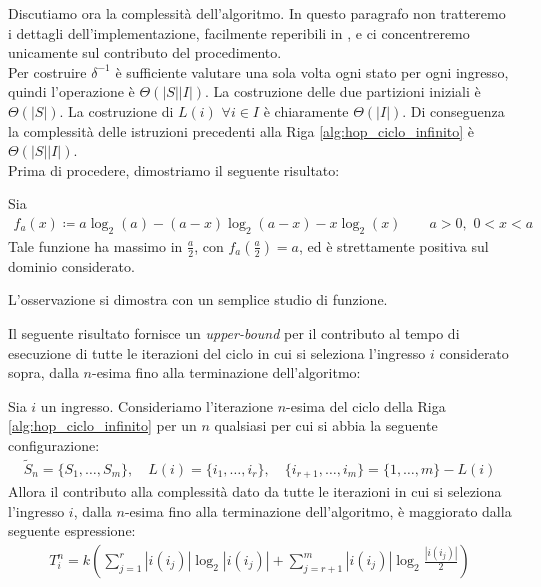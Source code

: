 Discutiamo ora la complessità dell'algoritmo. In questo paragrafo non tratteremo i dettagli dell'implementazione, facilmente reperibili in \cite{hopcroft}, e ci concentreremo unicamente sul contributo del procedimento.\\
Per costruire $\delta^{-1}$ è sufficiente valutare una sola volta ogni stato per ogni ingresso, quindi l'operazione è $\Theta(|S||I|)$. La costruzione delle due partizioni iniziali è $\Theta(|S|)$. La costruzione di $L(i) \,\,\forall i \in I$ è chiaramente $\Theta(|I|)$. Di conseguenza la complessità delle istruzioni precedenti alla Riga \ref{alg:hop_ciclo_infinito} è $\Theta(|S||I|)$.\\
Prima di procedere, dimostriamo il seguente risultato:
\begin{proposition}
    \label{obs:log}
    Sia
    \begin{gather*}
        f_a(x) \coloneqq a\log_2(a) - (a-x)\log_2(a-x) - x\log_2(x) \qquad a > 0,\,\, 0 < x < a
    \end{gather*}
    Tale funzione ha massimo in $\frac{a}{2}$, con $f_a(\frac{a}{2}) = a$, ed è strettamente positiva sul dominio considerato.
\end{proposition}
\begin{proof2}
    L'osservazione si dimostra con un semplice studio di funzione.
\end{proof2}
Il seguente risultato fornisce un \emph{upper-bound} per il contributo al tempo di esecuzione di tutte le iterazioni del ciclo in cui si seleziona l'ingresso $i$ considerato sopra, dalla $n$-esima fino alla terminazione dell'algoritmo:
\begin{theorem}
    Sia $i$ un ingresso. Consideriamo l'iterazione $n$-esima del ciclo della Riga \ref{alg:hop_ciclo_infinito} per un $n$ qualsiasi per cui si abbia la seguente configurazione:
    \begin{gather*}
        \widetilde{S}_n = \{S_1,\dots,S_m\}, \quad L(i) = \{i_1,\dots,i_r\}, \quad  \{i_{r+1},\dots,i_m\} = \{1,\dots,m\} - L(i)
    \end{gather*}
    Allora il contributo alla complessità dato da tutte le iterazioni in cui si seleziona l'ingresso $i$, dalla $n$-esima fino alla terminazione dell'algoritmo, è maggiorato dalla seguente espressione:
    \begin{gather*}
        T_i^n = k\left(\sum_{j = 1}^r |i(i_j)|\log_2|i(i_j)| + \sum_{j = r+1}^m |i(i_j)|\log_2\frac{|i(i_j)|}{2}\right)
    \end{gather*}
\end{theorem}
